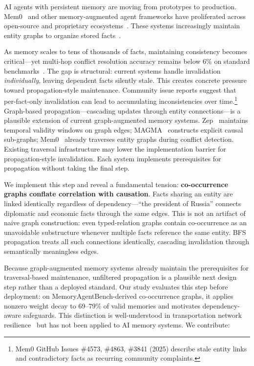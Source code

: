 \documentclass{article}
\begin{document}
AI agents with persistent memory are moving from prototypes to production.
Mem0~\citep{mem0_2024} and other memory-augmented agent frameworks have proliferated across open-source and proprietary ecosystems~\citep{graph_agent_memory_survey_2026}.
These systems increasingly maintain entity graphs to organize stored facts~\citep{mem0_2024, magma_2026, zep_2025}.

As memory scales to tens of thousands of facts, maintaining consistency becomes critical---yet multi-hop conflict resolution accuracy remains below 6\% on standard benchmarks~\citep{memoryagentbench_2026}.
The gap is structural: current systems handle invalidation \textit{individually}, leaving dependent facts silently stale.
This creates concrete pressure toward propagation-style maintenance.
Community issue reports suggest that per-fact-only invalidation can lead to accumulating inconsistencies over time.\footnote{Mem0 GitHub Issues \#4573, \#4863, \#3841 (2025) describe stale entity links and contradictory facts as recurring community complaints.}
Graph-based propagation---cascading updates through entity connections---is a plausible extension of current graph-augmented memory systems.
Zep~\citep{zep_2025} maintains temporal validity windows on graph edges; MAGMA~\citep{magma_2026} constructs explicit causal sub-graphs; Mem0~\citep{mem0_2024} already traverses entity graphs during conflict detection.
Existing traversal infrastructure may lower the implementation barrier for propagation-style invalidation.
Each system implements prerequisites for propagation without taking the final step.

We implement this step and reveal a fundamental tension: \textbf{co-occurrence graphs conflate correlation with causation}.
Facts sharing an entity are linked identically regardless of dependency---``the president of Russia'' connects diplomatic and economic facts through the same edges.
This is not an artifact of naive graph construction: even typed-relation graphs contain co-occurrence as an unavoidable substructure whenever multiple facts reference the same entity.
BFS propagation treats all such connections identically, cascading invalidation through semantically meaningless edges.

Because graph-augmented memory systems already maintain the prerequisites for traversal-based maintenance, unfiltered propagation is a plausible next design step rather than a deployed standard.
Our study evaluates this step before deployment: on MemoryAgentBench-derived co-occurrence graphs, it applies nonzero weight decay to 69--79\% of valid memories and motivates dependency-aware safeguards.
This distinction is well-understood in transportation network resilience~\citep{chen_network_2007} but has not been applied to AI memory systems.
We contribute:
\end{document}
